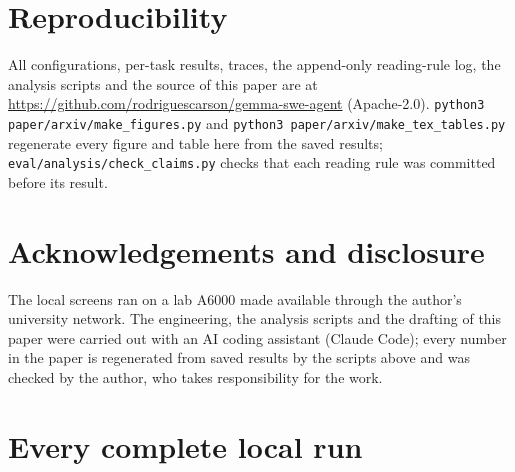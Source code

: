 \documentclass[11pt]{article}
\begin{document}
\section*{Reproducibility}
\begin{sloppypar}
All configurations, per-task results, traces, the append-only reading-rule log, the analysis scripts and the source of this
paper are at \url{https://github.com/rodriguescarson/gemma-swe-agent} (Apache-2.0). \texttt{python3 paper/arxiv/make\_figures.py}
and \texttt{python3 paper/arxiv/make\_tex\_tables.py} regenerate every figure and table here from the saved results;
\texttt{eval/analysis/check\_claims.py} checks that each reading rule was committed before its result.
\end{sloppypar}

\section*{Acknowledgements and disclosure}
The local screens ran on a lab A6000 made available through the author's university network. The engineering, the analysis
scripts and the drafting of this paper were carried out with an AI coding assistant (Claude Code); every number in the paper
is regenerated from saved results by the scripts above and was checked by the author, who takes responsibility for the work.




\appendix
\section{Every complete local run}
\begin{table}[h]
\centering\footnotesize

\caption{All complete 74-task runs on the paced A6000. ``120-task h'' projects the mean seconds per task onto a 120-task
hidden run.}
\label{tab:runs}
\end{table}
\end{document}
